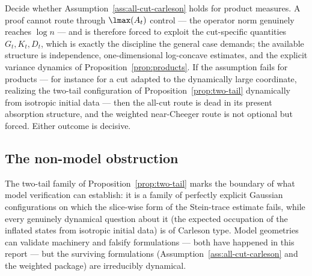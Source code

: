 \documentclass[../../main.tex]{subfiles}
\begin{document}
\begin{program}
\label{prog:product-test}
Decide whether Assumption~\ref{ass:all-cut-carleson} holds for product measures. A proof
cannot route through $\lmax(A_t)$ control --- the operator norm genuinely reaches $\log n$ ---
and is therefore forced to exploit the cut-specific quantities $G_t,K_t,D_t$, which is exactly
the discipline the general case demands; the available structure is independence,
one-dimensional log-concave estimates, and the explicit variance dynamics of
Proposition~\ref{prop:products}. If the assumption fails for products --- for instance for a
cut adapted to the dynamically large coordinate, realizing the two-tail configuration of
Proposition~\ref{prop:two-tail} dynamically from isotropic initial data --- then the all-cut
route is dead in its present absorption structure, and the weighted near-Cheeger route is not
optional but forced. Either outcome is decisive.
\end{program}

\subsection{The non-model obstruction}

The two-tail family of Proposition~\ref{prop:two-tail} marks the boundary of what model
verification can establish: it is a family of perfectly explicit Gaussian configurations on
which the slice-wise form of the Stein-trace estimate fails, while every genuinely dynamical
question about it (the expected occupation of the inflated states from isotropic initial data)
is of Carleson type. Model geometries can validate machinery and falsify formulations --- both
have happened in this report --- but the surviving formulations
(Assumption~\ref{ass:all-cut-carleson} and the weighted package) are irreducibly dynamical.
\end{document}
